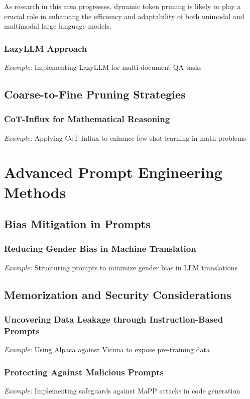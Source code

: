 \documentclass{book}
\begin{document}
As research in this area progresses, dynamic token pruning is likely to play a crucial role in enhancing the efficiency and adaptability of both unimodal and multimodal large language models.

\subsection{LazyLLM Approach}
\textit{Example:} Implementing LazyLLM for multi-document QA tasks \cite{fu2024}

\section{Coarse-to-Fine Pruning Strategies}
\subsection{CoT-Influx for Mathematical Reasoning}
\textit{Example:} Applying CoT-Influx to enhance few-shot learning in math problems \cite{huang2023}

\chapter{Advanced Prompt Engineering Methods}
\section{Bias Mitigation in Prompts}
\subsection{Reducing Gender Bias in Machine Translation}
\textit{Example:} Structuring prompts to minimize gender bias in LLM translations \cite{sant2024}

\section{Memorization and Security Considerations}
\subsection{Uncovering Data Leakage through Instruction-Based Prompts}
\textit{Example:} Using Alpaca against Vicuna to expose pre-training data \cite{kassem2024}

\subsection{Protecting Against Malicious Prompts}
\textit{Example:} Implementing safeguards against MaPP attacks in code generation \cite{heibel2024}
\end{document}
